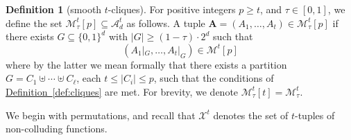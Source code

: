 \documentclass[11pt]{article}
\numberwithin{equation}{section}
\theoremstyle{definition}
\newtheorem{definition}[theorem]{Definition}
\theoremstyle{plain}
\newcommand{\expref}[2]{\hyperref[#2]{#1~\ref{#2}}}
\newcommand{\advfam}{\mathcal{A}}
\newcommand{\abs}[1]{\left\lvert #1\right\rvert}
\def\MM{{\mathcal{M}}}
\begin{document}
\begin{definition}[smooth $t$-cliques]\label{def:smooth inv}
	For positive integers $p \ge t$, and $\tau \in [0,1]$, we define the 
	set $\MM_\tau^t[p] \subseteq \advfam_d^t$ as follows. A tuple $
	\bm{A} =(A_1,\ldots,A_t) \in \MM_\tau^t[p]$ if there exists $G 
	\subseteq \{0,1\}^d$ with $\abs{G} \geq (1-\tau)\cdot2^d$ such that 
\[
\left( A_1|_G,\ldots,A_t|_G \right) \in \MM^t[p]
\]
where by the latter we mean formally that there exists a partition $G = C_1 \uplus \cdots \uplus C_\ell$, each $t \le |C_i| \le p$, such that
the conditions of \expref{Definition}{def:cliques} are met. For brevity, we denote $\MM_{\tau}^t[t] = \MM_\tau^t$.
%
\end{definition}

We begin with permutations, and recall that $\mathcal{X}^{t}$ denotes the set of $t$-tuples of non-colluding functions.
\end{document}
